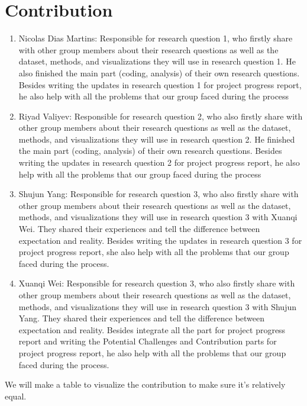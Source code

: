 \documentclass[12pt]{article}
\begin{document}
\newpage
\section{Contribution}
\begin{enumerate}
	\item Nicolas Dias Martins: Responsible for research question 1, who firstly share with other group members about their research questions as well as the dataset, methods, and visualizations they will use in research question 1. He also finished the main part (coding, analysis) of their own research questions. Besides writing the updates in research question 1 for project progress report, he also help with all the problems that our group faced during the process
	\item Riyad Valiyev: Responsible for research question 2, who also firstly share with other group members about their research questions as well as the dataset, methods, and visualizations they will use in research question 2. He finished the main part (coding, analysis) of their own research questions. Besides writing the updates in research question 2 for project progress report, he also help with all the problems that our group faced during the process
	\item Shujun Yang: Responsible for research question 3, who also firstly share with other group members about their research questions as well as the dataset, methods, and visualizations they will use in research question 3 with Xuanqi Wei. They shared their experiences and tell the difference between expectation and reality. Besides writing the updates in research question 3 for project progress report, she also help with all the problems that our group faced during the process.
	\item Xuanqi Wei: Responsible for research question 3, who also firstly share with other group members about their research questions as well as the dataset, methods, and visualizations they will use in research question 3 with Shujun Yang. They shared their experiences and tell the difference between expectation and reality. Besides integrate all the part for project progress report and writing the Potential Challenges and Contribution parts for project progress report, he also help with all the problems that our group faced during the process.
\end{enumerate}

We will make a table to visualize the contribution to make sure it's relatively equal.
\end{document}
